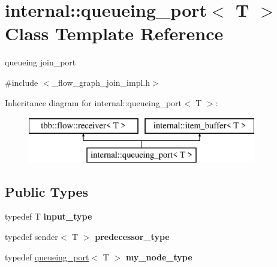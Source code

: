 \hypertarget{classinternal_1_1queueing__port}{}\section{internal\+:\+:queueing\+\_\+port$<$ T $>$ Class Template Reference}
\label{classinternal_1_1queueing__port}


queueing join\+\_\+port  




{\ttfamily \#include $<$\+\_\+flow\+\_\+graph\+\_\+join\+\_\+impl.\+h$>$}

Inheritance diagram for internal\+:\+:queueing\+\_\+port$<$ T $>$\+:\begin{figure}[H]
\begin{center}
\leavevmode
\includegraphics[height=2.000000cm]{classinternal_1_1queueing__port}
\end{center}
\end{figure}
\subsection*{Public Types}
\begin{DoxyCompactItemize}
\item 
\hypertarget{classinternal_1_1queueing__port_a8531a9e37933c07863d8eff560b1f4fc}{}typedef T {\bfseries input\+\_\+type}\label{classinternal_1_1queueing__port_a8531a9e37933c07863d8eff560b1f4fc}

\item 
\hypertarget{classinternal_1_1queueing__port_a894847300ecf130239e8482e24c60f5a}{}typedef sender$<$ T $>$ {\bfseries predecessor\+\_\+type}\label{classinternal_1_1queueing__port_a894847300ecf130239e8482e24c60f5a}

\item 
\hypertarget{classinternal_1_1queueing__port_a7035451572baf72e3eff987f61644aa3}{}typedef \hyperlink{classinternal_1_1queueing__port}{queueing\+\_\+port}$<$ T $>$ {\bfseries my\+\_\+node\+\_\+type}\label{classinternal_1_1queueing__port_a7035451572baf72e3eff987f61644aa3}

\end{DoxyCompactItemize}
